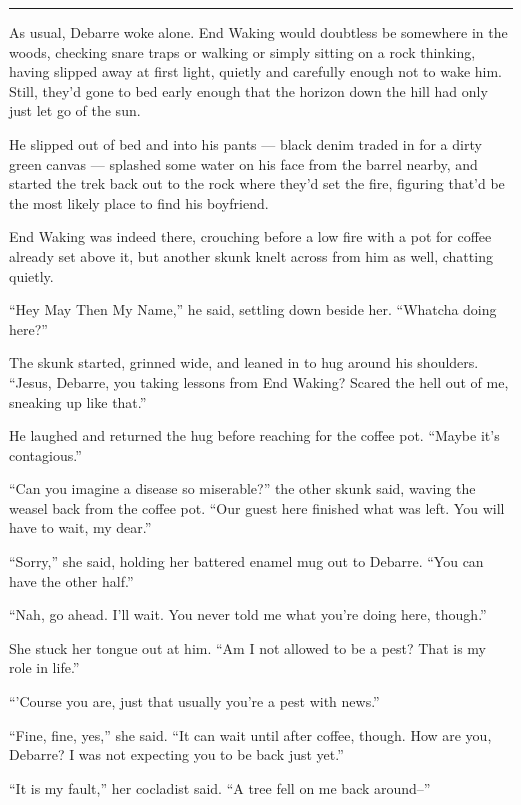 \begin{center}\rule{0.5\linewidth}{0.5pt}\end{center}

As usual, Debarre woke alone. End Waking would doubtless be somewhere in the woods, checking snare traps or walking or simply sitting on a rock thinking, having slipped away at first light, quietly and carefully enough not to wake him. Still, they'd gone to bed early enough that the horizon down the hill had only just let go of the sun.

He slipped out of bed and into his pants — black denim traded in for a dirty green canvas — splashed some water on his face from the barrel nearby, and started the trek back out to the rock where they'd set the fire, figuring that'd be the most likely place to find his boyfriend.

End Waking was indeed there, crouching before a low fire with a pot for coffee already set above it, but another skunk knelt across from him as well, chatting quietly.

``Hey May Then My Name,'' he said, settling down beside her. ``Whatcha doing here?''

The skunk started, grinned wide, and leaned in to hug around his shoulders. ``Jesus, Debarre, you taking lessons from End Waking? Scared the hell out of me, sneaking up like that.''

He laughed and returned the hug before reaching for the coffee pot. ``Maybe it's contagious.''

``Can you imagine a disease so miserable?'' the other skunk said, waving the weasel back from the coffee pot. ``Our guest here finished what was left. You will have to wait, my dear.''

``Sorry,'' she said, holding her battered enamel mug out to Debarre. ``You can have the other half.''

``Nah, go ahead. I'll wait. You never told me what you're doing here, though.''

She stuck her tongue out at him. ``Am I not allowed to be a pest? That is my role in life.''

``'Course you are, just that usually you're a pest with news.''

``Fine, fine, yes,'' she said. ``It can wait until after coffee, though. How are you, Debarre? I was not expecting you to be back just yet.''

``It is my fault,'' her cocladist said. ``A tree fell on me back around--''

